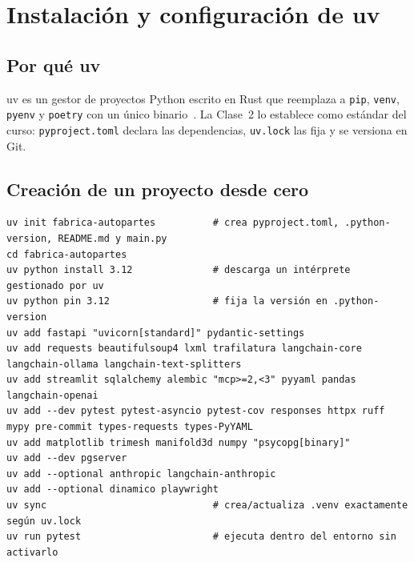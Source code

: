

\chapter{Instalación y configuración de uv}\label{cap:uv}

\section{Por qué uv}
uv es un gestor de proyectos Python escrito en Rust que reemplaza a \texttt{pip}, \texttt{venv},
\texttt{pyenv} y \texttt{poetry} con un único binario~\cite{uv}. La Clase~2 lo establece como estándar del
curso: \texttt{pyproject.toml} declara las dependencias, \texttt{uv.lock} las fija y se versiona en Git.

\section{Creación de un proyecto desde cero}
\begin{lstlisting}[style=ps]
uv init fabrica-autopartes          # crea pyproject.toml, .python-version, README.md y main.py
cd fabrica-autopartes
uv python install 3.12              # descarga un intérprete gestionado por uv
uv python pin 3.12                  # fija la versión en .python-version
uv add fastapi "uvicorn[standard]" pydantic-settings
uv add requests beautifulsoup4 lxml trafilatura langchain-core langchain-ollama langchain-text-splitters
uv add streamlit sqlalchemy alembic "mcp>=2,<3" pyyaml pandas langchain-openai
uv add --dev pytest pytest-asyncio pytest-cov responses httpx ruff mypy pre-commit types-requests types-PyYAML
uv add matplotlib trimesh manifold3d numpy "psycopg[binary]"
uv add --dev pgserver
uv add --optional anthropic langchain-anthropic
uv add --optional dinamico playwright
uv sync                             # crea/actualiza .venv exactamente según uv.lock
uv run pytest                       # ejecuta dentro del entorno sin activarlo
\end{lstlisting}

